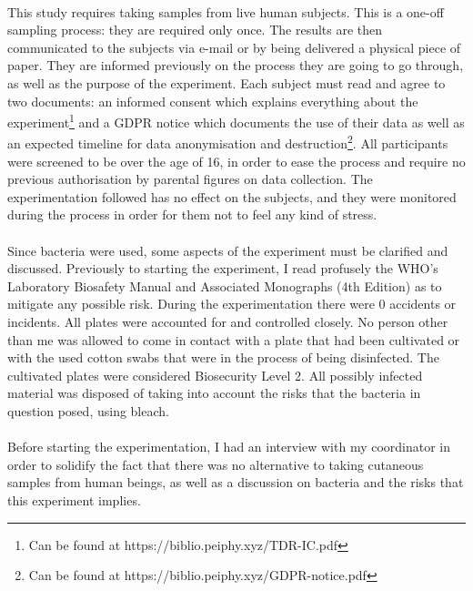 \documentclass[fontsize=12pt,twoside=semi,openright,numbers=noenddot,parskip=half]{scrbook}
\begin{document}
\paragraph{}This study requires taking samples from live human subjects. This is a one-off sampling process: they are required only once. The results are then communicated to the subjects via e-mail or by being delivered a physical piece of paper. They are informed previously on the process they are going to go through, as well as the purpose of the experiment. Each subject must read and agree to two documents: an informed consent which explains everything about the experiment\footnote{Can be found at https://biblio.peiphy.xyz/TDR-IC.pdf} and a GDPR notice which documents the use of their data as well as an expected timeline for data anonymisation and destruction\footnote{Can be found at https://biblio.peiphy.xyz/GDPR-notice.pdf}. All participants were screened to be over the age of 16, in order to ease the process and require no previous authorisation by parental figures on data collection. The experimentation followed has no effect on the subjects, and they were monitored during the process in order for them not to feel any kind of stress.
\paragraph{}Since bacteria were used, some aspects of the experiment must be clarified and discussed. Previously to starting the experiment, I read profusely the WHO's Laboratory Biosafety Manual and Associated Monographs (4th Edition) as to mitigate any possible risk. During the experimentation there were 0 accidents or incidents. All plates were accounted for and controlled closely. No person other than me was allowed to come in contact with a plate that had been cultivated or with the used cotton swabs that were in the process of being disinfected. The cultivated plates were considered Biosecurity Level 2. All possibly infected material was disposed of taking into account the risks that the bacteria in question posed, using bleach.
\paragraph{}Before starting the experimentation, I had an interview with my coordinator in order to solidify the fact that there was no alternative to taking cutaneous samples from human beings, as well as a discussion on bacteria and the risks that this experiment implies.
\end{document}
